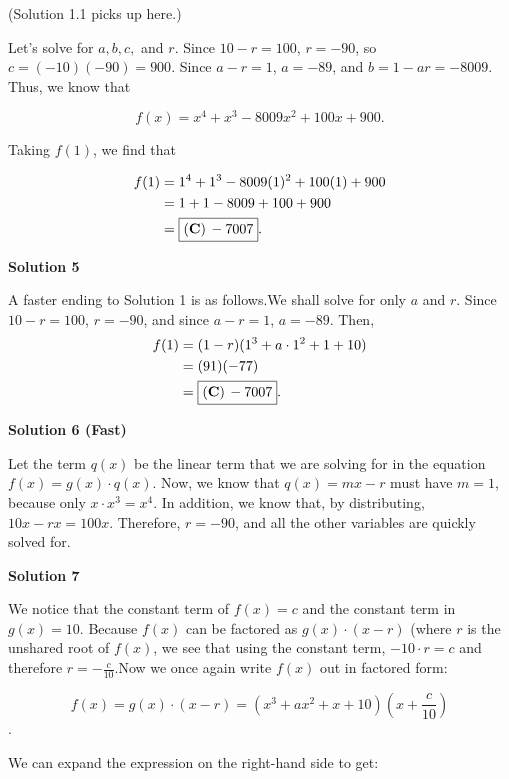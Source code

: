 \begin{enumerate}
 (Solution 1.1 picks up here.)

 Let's solve for $a,b,c,$ and $r$. Since $10-r=100$, $r=-90$, so $c=(-10)(-90)=900$. Since $a-r=1$, $a=-89$, and $b=1-ar=-8009$. Thus, we know that

 
 \[f(x)=x^4+x^3-8009x^2+100x+900.\]

 Taking $f(1)$, we find that

 
 \begin{align*} f(1)&=1^4+1^3-8009(1)^2+100(1)+900\\ &=1+1-8009+100+900\\ &=\boxed{\bold{(C)}\, -7007}.\\ \end{align*}





\textbf{Solution 5}

A faster ending to Solution 1 is as follows.We shall solve for only $a$ and $r$. Since $10-r=100$, $r=-90$, and since $a-r=1$, $a=-89$. Then,
 \begin{align*} f(1)&=(1-r)(1^3+a\cdot1^2+1+10)\\ &=(91)(-77)\\ &=\boxed{\bold{(C)}\, -7007}.\\ \end{align*}





\textbf{Solution 6 (Fast)}

Let the term $q(x)$ be the linear term that we are solving for in the equation $f(x)=g(x)\cdot q(x)$. Now, we know that $q(x)=mx-r$ must have $m=1$, because only $x \cdot x^3=x^4$. In addition, we know that, by distributing, $10x-rx=100x$. Therefore, $r=-90$, and all the other variables are quickly solved for.

 



\textbf{Solution 7}

We notice that the constant term of $f(x)=c$ and the constant term in $g(x)=10$. Because $f(x)$ can be factored as $g(x) \cdot (x- r)$ (where $r$ is the unshared root of $f(x)$, we see that using the constant term, $-10 \cdot r = c$ and therefore $r = -\frac{c}{10}$.Now we once again write $f(x)$ out in factored form: 

 
 \[f(x) = g(x)\cdot (x-r) = (x^3+ax^2+x+10)\left(x+\frac{c}{10}\right)\].

 We can expand the expression on the right-hand side to get:


\end{enumerate}
